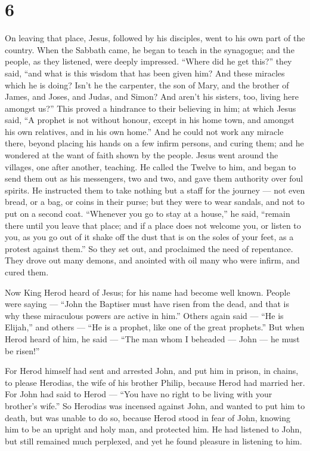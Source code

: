 \hypertarget{section-5}{%
\section{6}\label{section-5}}

 On leaving that place, Jesus, followed by his disciples,
went to his own part of the country.  When the Sabbath came,
he began to teach in the synagogue; and the people, as they listened,
were deeply impressed. ``Where did he get this?'' they said, ``and what
is this wisdom that has been given him? And these miracles which he is
doing?  Isn't he the carpenter, the son of Mary, and the
brother of James, and Joses, and Judas, and Simon? And aren't his
sisters, too, living here amongst us?'' This proved a hindrance to their
believing in him;  at which Jesus said, ``A prophet is not
without honour, except in his home town, and amongst his own relatives,
and in his own home.''  And he could not work any miracle
there, beyond placing his hands on a few infirm persons, and curing
them;  and he wondered at the want of faith shown by the
people. Jesus went around the villages, one after another, teaching.
 He called the Twelve to him, and began to send them out as
his messengers, two and two, and gave them authority over foul spirits.
 He instructed them to take nothing but a staff for the
journey --- not even bread, or a bag, or coins in their purse;
 but they were to wear sandals, and not to put on a second
coat.  ``Whenever you go to stay at a house,'' he said,
``remain there until you leave that place;  and if a place
does not welcome you, or listen to you, as you go out of it shake off
the dust that is on the soles of your feet, as a protest against them.''
 So they set out, and proclaimed the need of repentance.
 They drove out many demons, and anointed with oil many who
were infirm, and cured them.

 Now King Herod heard of Jesus; for his name had become
well known. People were saying --- ``John the Baptiser must have risen
from the dead, and that is why these miraculous powers are active in
him.''  Others again said --- ``He is Elijah,'' and others
--- ``He is a prophet, like one of the great prophets.'' 
But when Herod heard of him, he said --- ``The man whom I beheaded ---
John --- he must be risen!''

 For Herod himself had sent and arrested John, and put him
in prison, in chains, to please Herodias, the wife of his brother
Philip, because Herod had married her.  For John had said
to Herod --- ``You have no right to be living with your brother's
wife.''  So Herodias was incensed against John, and wanted
to put him to death, but was unable to do so,  because
Herod stood in fear of John, knowing him to be an upright and holy man,
and protected him. He had listened to John, but still remained much
perplexed, and yet he found pleasure in listening to him.

